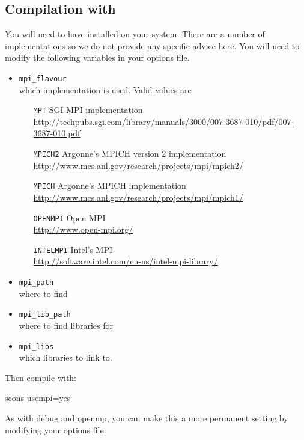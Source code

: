 \subsection{Compilation with \mpi}
You will need to have \mpi installed on your system.
There are a number of implementations so we do not provide any specific advice here.
You will need to modify the following variables in your options file.
\begin{itemize}
 \item \texttt{mpi_flavour} \\
	which \mpi implementation is used. Valid values are
    \begin{itemize}
        \item[\texttt{MPT}] SGI MPI implementation \\
            \url{http://techpubs.sgi.com/library/manuals/3000/007-3687-010/pdf/007-3687-010.pdf}
        \item[\texttt{MPICH2}] Argonne's MPICH version 2 implementation \\
            \url{http://www.mcs.anl.gov/research/projects/mpi/mpich2/}
        \item[\texttt{MPICH}] Argonne's MPICH implementation \\
            \url{http://www.mcs.anl.gov/research/projects/mpi/mpich1/}
        \item[\texttt{OPENMPI}] Open MPI \\
            \url{http://www.open-mpi.org/}
        \item[\texttt{INTELMPI}] Intel's MPI \\
            \url{http://software.intel.com/en-us/intel-mpi-library/}
    \end{itemize}
 \item \texttt{mpi_path} \\
	where to find 
 \item \texttt{mpi_lib_path} \\
	where to find libraries for \mpi
 \item \texttt{mpi_libs} \\
	which libraries to link to.
\end{itemize}

Then compile with:
\begin{shellCode}
 scons usempi=yes
\end{shellCode}

As with debug and openmp, you can make this a more permanent setting by modifying your options file.

